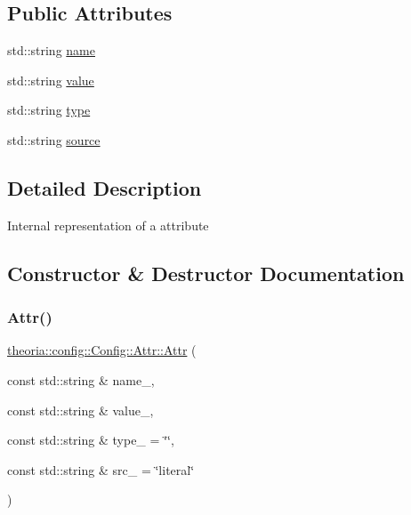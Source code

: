 \subsection*{Public Attributes}
\begin{DoxyCompactItemize}
\item 
std\+::string \hyperlink{structtheoria_1_1config_1_1Config_1_1Attr_ad39ea60695427392538c9b70631e3893}{name}
\item 
std\+::string \hyperlink{structtheoria_1_1config_1_1Config_1_1Attr_a089f492d8f4a5ca06879bef7dfc178f0}{value}
\item 
std\+::string \hyperlink{structtheoria_1_1config_1_1Config_1_1Attr_a6bb657b1e985b583434f46a868f02908}{type}
\item 
std\+::string \hyperlink{structtheoria_1_1config_1_1Config_1_1Attr_aa2f90ed2b4db859ac6a83ec6b4d085e9}{source}
\end{DoxyCompactItemize}


\subsection{Detailed Description}
Internal representation of a attribute 

\subsection{Constructor \& Destructor Documentation}
\mbox{\label{structtheoria_1_1config_1_1Config_1_1Attr_ab06451bb786404d66a1fce58229310f6}} 
\subsubsection{\texorpdfstring{Attr()}{Attr()}}
{\footnotesize\ttfamily \hyperlink{structtheoria_1_1config_1_1Config_1_1Attr}{theoria\+::config\+::\+Config\+::\+Attr\+::\+Attr} (\begin{DoxyParamCaption}\item[{const std\+::string \&}]{name\+\_\+,  }\item[{const std\+::string \&}]{value\+\_\+,  }\item[{const std\+::string \&}]{type\+\_\+ = {\ttfamily \char`\"{}\char`\"{}},  }\item[{const std\+::string \&}]{src\+\_\+ = {\ttfamily \char`\"{}literal\char`\"{}} }\end{DoxyParamCaption})\hspace{0.3cm}{\ttfamily [inline]}}

